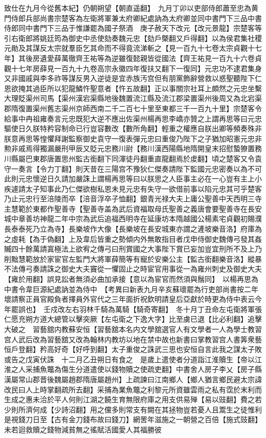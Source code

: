 致仕在九月今從舊本紀】仍朝朔望【朝直遥翻】　九月丁卯以吏部侍郎蕭至忠為黄門侍郎兵部尚書宗楚客為左衛將軍兼太府卿紀處訥為太府卿並同中書門下三品中書侍郎同中書門下三品于惟謙罷為國子祭酒　庚子赦天下改元【改元景龍】宗楚客等引右衛郎將姚廷筠為御史中丞使劾奏魏元忠【劾戶槩翻又戶得翻】以為侯君集社稷元勛及其謀反太宗就羣臣乞其命而不得竟流涕斬之【見一百九十七卷太宗貞觀十七年】其後房遺愛薛萬徹齊王祐等為逆雖復懿親皆從國法【齊王祐見一百九十六卷貞觀十七年房薛見一百九十九卷高宗永徽四年復扶又翻下一復同】元忠功不逮君集身又非國戚與李多祚等謀反男入逆徒是宜赤族汚宫但有朋黨飾辭營救以惑聖聽陛下仁恩欲掩其過臣所以犯龍鱗忤聖意者【忤五故翻】正以事關宗社耳上頗然之元忠坐繫大理貶渠州司馬【渠州漢宕渠縣地後魏置流江縣及流江郡梁置渠州後周又為北宕渠郡隋復置渠州舊志渠州京師西南二千二百七十里至東都三千一百九十里】宗楚客令給事中冉祖雍奏言元忠既犯大逆不應出佐渠州楊再思李嶠亦贊之上謂再思等曰元忠驅使日久朕特矜容制命已行豈容數改【數所角翻】輕重之權應自朕出卿等頻奏殊非朕意再思等惶懼拜謝監察御史袁守一復表彈元忠曰重俊乃陛下之子猶加昭憲元忠非勲非戚焉得獨漏嚴刑甲辰又貶元忠務川尉【務川漢西陽縣地隋開皇末招慰蟄獠置務川縣屬巴東郡唐置思州監古銜翻下同渾徒丹翻重直龍翻焉於䖍翻】頃之楚客又令袁守一奏言【令力丁翻】則天昔在三陽宫不豫狄仁傑奏請陛下監國元忠密奏以為不可此則元忠懷逆日久請加嚴誅上謂楊再思等曰以朕思之人臣事主必在一心豈有主上小疾遽請太子知事此乃仁傑欲樹私恩未見元忠有失守一欲借前事以陷元忠其可乎楚客乃止元忠行至涪陵而卒【涪音浮卒子恤翻】銀青光禄大夫上庸公聖善中天西明三寺主慧範於東都作聖善寺【聖善寺盖為武后資福取母氏聖善之義唐會要聖善寺在長安城中章善坊神龍二年中宗為武后追福西明寺在延康坊本隋越國公楊素宅貞觀初賜濮長泰泰死乃立為寺】長樂坡作大像【長樂坡在長安城東亦謂之滻坡樂音洛】府庫為之虛耗【為于偽翻】上及韋后皆重之勢傾内外無敢指目者戊申侍御史魏傳弓發其姦贓四十餘萬請寘極法上欲宥之傳弓曰刑賞國之大事陛下賞已妄加豈宜刑所不及上乃削黜慧範放於家宦官左監門大將軍薛簡等有寵於安樂公主【監古銜翻樂音洛】縱暴不法傳弓奏請誅之御史大夫竇從一懼固止之時宦官用事從一為雍州刺史及御史大夫【雍於用翻】誤見訟者無須必曲加承接【意以為宦官而然須與鬚同】　以楊再思為中書令韋巨源紀處訥並為侍中　【考異曰新表九月辛亥蘇瓌罷為行吏部尚書按二年壞請察正員官殿負者擇員外官代之三年面折祝欽明請皇后亞獻於時更為侍中表云今年罷誤也】　壬戍改左右羽林千騎為萬騎【騎奇寄翻】　冬十月丁丑命左屯衛將軍張仁愿充朔方道大總管以擊突厥【左屯衛之下逸大字】比至虜已退【比必利翻】追擊大破之　習藝舘内教蘇安恒【習藝舘本名内文學舘選官人有文學者一人為學士教習宫人武后改為習藝舘又改為翰林内教坊以地在禁中故也新書曰掌教習宫人書筭衆藝恒戶登翻】矜高好奇【好呼到翻】太子重俊之誅武三思也安恒自言此我之謀太子敗或告之戊寅伏誅　十二月乙丑朔日有食之　是歲上遣使者分道詣江淮贖生【帝以江淮之人采捕魚鼈為傷生分道遣使以錢物贖之使疏吏翻】中書舍人房子李乂【房子縣漢屬常山郡晋後魏屬趙郡隋唐屬趙州】上疏諫曰江南鄉人【鄉人猶言鄉民避太宗諱改民曰人上時掌翻疏所去翻】采捕為業魚鼈之利黎元所資雖雲雨之私有霑於末利而生成之惠未洽於平人何則江湖之饒生育無限府庫之用支供易殚【易以豉翻】費之若少則所濟何成【少詩沼翻】用之儻多則常支有闕在其拯物豈若憂人且鬻生之徒惟利是視錢刀日至【古有金刀錢布故曰錢刀】網罟年滋施之一朝營之百倍【施式豉翻】未若迴救贖之錢物減貧無之徭賦活國愛人其福勝彼

